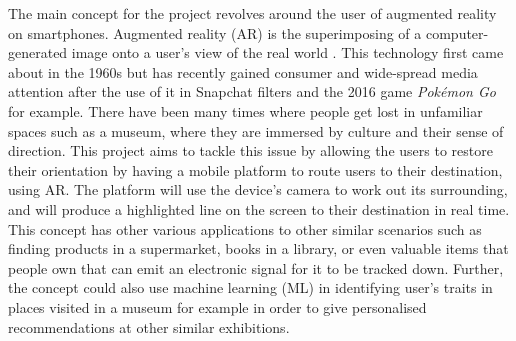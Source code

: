 
The main concept for the project revolves around the user of augmented reality on smartphones. Augmented reality (AR) is the superimposing of a computer-generated image onto a user's view of the real world \cite{oxforddict}. This technology first came about in the 1960s but has recently gained consumer and wide-spread media attention after the use of it in Snapchat filters and the 2016 game \textit{Pokémon Go} for example. There have been many times where people get lost in unfamiliar spaces such as a museum, where they are immersed by culture and their sense of direction. This project aims to tackle this issue by allowing the users to restore their orientation by having a mobile platform to route users to their destination, using AR. The platform will use the device's camera to work out its surrounding, and will produce a highlighted line on the screen to their destination in real time.\\ 

This concept has other various applications to other similar scenarios such as finding products in a supermarket, books in a library, or even valuable items that people own that can emit an electronic signal for it to be tracked down. Further, the concept could also use machine learning (ML) in identifying user's traits in places visited in a museum for example in order to give personalised recommendations at other similar exhibitions.